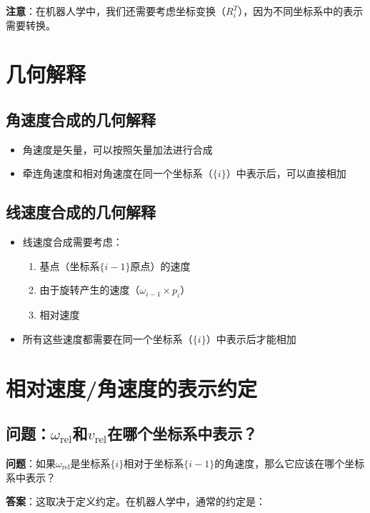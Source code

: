 \documentclass[12pt,a4paper]{article}
\begin{document}
\textbf{注意}：在机器人学中，我们还需要考虑坐标变换（$R_i^T$），因为不同坐标系中的表示需要转换。

\section{几何解释}

\subsection{角速度合成的几何解释}

\begin{itemize}
\item 角速度是矢量，可以按照矢量加法进行合成
\item 牵连角速度和相对角速度在同一个坐标系（$\{i\}$）中表示后，可以直接相加
\end{itemize}

\subsection{线速度合成的几何解释}

\begin{itemize}
\item 线速度合成需要考虑：
\begin{enumerate}
\item 基点（坐标系$\{i-1\}$原点）的速度
\item 由于旋转产生的速度（$\omega_{i-1} \times p_i$）
\item 相对速度
\end{enumerate}
\item 所有这些速度都需要在同一个坐标系（$\{i\}$）中表示后才能相加
\end{itemize}

\section{相对速度/角速度的表示约定}

\subsection{问题：$\omega_{\text{rel}}$和$v_{\text{rel}}$在哪个坐标系中表示？}

\textbf{问题}：如果$\omega_{\text{rel}}$是坐标系$\{i\}$相对于坐标系$\{i-1\}$的角速度，那么它应该在哪个坐标系中表示？

\textbf{答案}：这取决于定义约定。在机器人学中，通常的约定是：
\end{document}
